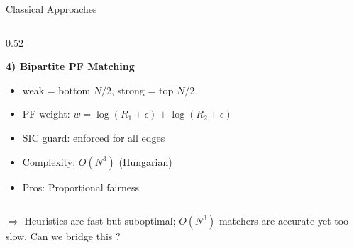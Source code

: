 \documentclass[aspectratio=169]{beamer}
\begin{document}
\begin{frame}{Classical Approaches}
\begin{columns}[T,onlytextwidth]
\begin{column}{0.52\textwidth}
        
            \textbf{4) Bipartite PF Matching}
            \begin{itemize}\itemsep0.15em
                \item  weak = bottom $N/2$, strong = top $N/2$
                \item {PF weight:} $w = \log(R_1 + \epsilon) + \log(R_2 + \epsilon)$
                \item {SIC guard:} enforced for all edges
                \item Complexity: $O(N^3)$ (Hungarian)
                \item \textcolor{nomagreen}{Pros:} Proportional fairness
            \end{itemize}
        \end{column}
    \end{columns}

 
    \small \textcolor{iiitblue}{$\Rightarrow$ Heuristics are fast but suboptimal; $O(N^3)$ matchers are accurate yet too slow. Can we bridge this ?}
\end{frame}
\end{document}
